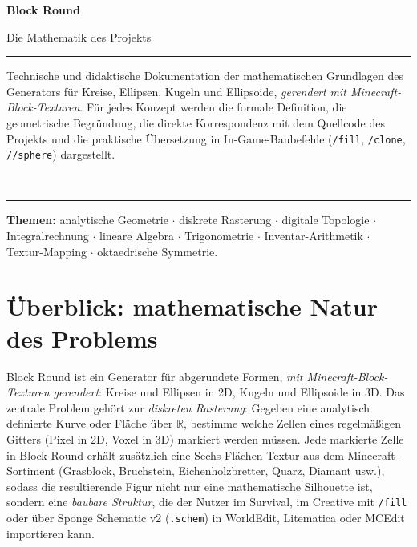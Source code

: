 \documentclass[12pt,a4paper]{scrartcl}
\newcommand{\code}[1]{\texttt{\small #1}}
\newcommand{\cmd}[1]{\textcolor{earth}{\texttt{\small #1}}}
\begin{document}
\begin{titlepage}
  \centering
  \vspace*{3.5cm}
  {\sffamily\bfseries\fontsize{56}{60}\selectfont \color{accent} Block Round\par}
  \vspace{0.7cm}
  {\sffamily\LARGE\color{muted} Die Mathematik des Projekts\par}
  \vspace{1.4cm}
  {\color{rule}\rule{0.6\textwidth}{0.6pt}\par}
  \vspace{0.9cm}
  \begin{minipage}{0.82\textwidth}
    \centering\color{ink}\large
    Technische und didaktische Dokumentation der mathematischen Grundlagen des Generators für Kreise, Ellipsen, Kugeln und Ellipsoide, \emph{gerendert mit Minecraft-Block-Texturen}. Für jedes Konzept werden die formale Definition, die geometrische Begründung, die direkte Korrespondenz mit dem Quellcode des Projekts und die praktische Übersetzung in In-Game-Baubefehle (\cmd{/fill}, \cmd{/clone}, \cmd{//sphere}) dargestellt.
  \end{minipage}
  \vspace{0.9cm}\\
  {\color{rule}\rule{0.6\textwidth}{0.6pt}\par}
  \vspace{2cm}
  \begin{minipage}{0.78\textwidth}
    \centering\sffamily\small\color{muted}
    \textbf{Themen:} analytische Geometrie $\cdot$ diskrete Rasterung $\cdot$ digitale Topologie $\cdot$ Integralrechnung $\cdot$ lineare Algebra $\cdot$ Trigonometrie $\cdot$ Inventar-Arithmetik $\cdot$ Textur-Mapping $\cdot$ oktaedrische Symmetrie.
  \end{minipage}
\end{titlepage}

\renewcommand{\contentsname}{\color{accent}Inhaltsverzeichnis}
\tableofcontents
\thispagestyle{fancy}
\newpage

\section{Überblick: mathematische Natur des Problems}

Block Round ist ein Generator für abgerundete Formen, \emph{mit Minecraft-Block-Texturen gerendert}: Kreise und Ellipsen in 2D, Kugeln und Ellipsoide in 3D. Das zentrale Problem gehört zur \emph{diskreten Rasterung}: Gegeben eine analytisch definierte Kurve oder Fläche über $\mathbb{R}$, bestimme welche Zellen eines regelmäßigen Gitters (Pixel in 2D, Voxel in 3D) markiert werden müssen. Jede markierte Zelle in Block Round erhält zusätzlich eine Sechs-Flächen-Textur aus dem Minecraft-Sortiment (Grasblock, Bruchstein, Eichenholzbretter, Quarz, Diamant usw.), sodass die resultierende Figur nicht nur eine mathematische Silhouette ist, sondern eine \emph{baubare Struktur}, die der Nutzer im Survival, im Creative mit \cmd{/fill} oder über Sponge Schematic v2 (\code{.schem}) in WorldEdit, Litematica oder MCEdit importieren kann.
\end{document}
